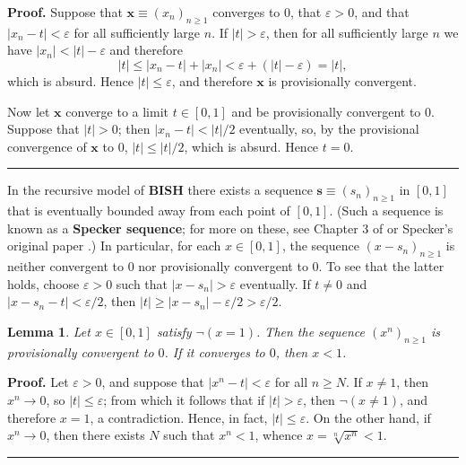 \documentclass[11pt]{article}%
\newtheorem{lemma}[theorem]{Lemma}
\newenvironment{proof}[1][Proof]{\noindent\textbf{#1.} }{\ \rule{0.5em}{0.5em}}
\begin{document}
\begin{proof}
Suppose that $\mathbf{x}\equiv\left(  x_{n}\right)  _{n\geqslant1}$ converges
to $0$, that $\varepsilon>0$, and that $\left\vert x_{n}-t\right\vert
<\varepsilon$ for all sufficiently large $n$. If $\left\vert t\right\vert
>\varepsilon$, then for all sufficiently large $n$ we have $\left\vert
x_{n}\right\vert <\left\vert t\right\vert -\varepsilon$ and therefore%
\[
\left\vert t\right\vert \leqslant\left\vert x_{n}-t\right\vert +\left\vert
x_{n}\right\vert <\varepsilon+\left(  \left\vert t\right\vert -\varepsilon
\right)  =\left\vert t\right\vert ,
\]
which is absurd. Hence $\left\vert t\right\vert \leqslant\varepsilon$, and
therefore $\mathbf{x}$ is provisionally convergent.

Now let $\mathbf{x}$ converge to a limit $t\in\left[  0,1\right]  $ and be
provisionally convergent to $0$. Suppose that $\left\vert t\right\vert >0$;
then $\left\vert x_{n}-t\right\vert <\left\vert t\right\vert /2$ eventually,
so, by the provisional convergence of $\mathbf{x}$ to $0$, $\left\vert
t\right\vert \leqslant\left\vert t\right\vert /2$, which is absurd. Hence
$t=0$.
\end{proof}%

\bigskip


In the recursive model of \textbf{BISH} there exists a sequence $\mathbf{s}%
\equiv\left(  s_{n}\right)  _{n\geqslant1}$ in $\left[  0,1\right]  $ that is
eventually bounded away from each point of $\left[  0,1\right]  $. (Such a
sequence is known as a \textbf{Specker sequence}; for more on these, see
Chapter 3 of \cite{BR} or Specker's original paper \cite{Specker}.) In
particular, for each $x\in\left[  0,1\right]  $, the sequence $\left(
x-s_{n}\right)  _{n\geqslant1}$ is neither convergent to $0$ nor provisionally
convergent to $0$. To see that the latter holds, choose $\varepsilon>0$ such
that $\left\vert x-s_{n}\right\vert >\varepsilon$ eventually. If $t\neq0$ and
$\left\vert x-s_{n}-t\right\vert <\varepsilon/2 $, then $\left\vert
t\right\vert \geq\left\vert x-s_{n}\right\vert -\varepsilon/2>\varepsilon/2$.

\begin{lemma}
\label{130511a3}Let $x\in\left[  0,1\right]  $ satisfy $\lnot\left(
x=1\right)  $. Then the sequence $\left(  x^{n}\right)  _{n\geqslant1}$ is
provisionally convergent to $0$. If it converges to $0$, then $x<1$.
\end{lemma}

\begin{proof}
Let $\varepsilon>0$, and suppose that $\left\vert x^{n}-t\right\vert
<\varepsilon$ for all $n\geqslant N$. If $x\neq1$, then $x^{n}\rightarrow0 $,
so $\left\vert t\right\vert \leqslant\varepsilon$; from which it follows that
if $\left\vert t\right\vert >\varepsilon$, then $\lnot\left(  x\neq1\right)
$, and therefore $x=1$, a contradiction. Hence, in fact, $\left\vert
t\right\vert \leqslant\varepsilon$. On the other hand, if $x^{n}\rightarrow0$,
then there exists $N$ such that $x^{n}<1$, whence $x=\sqrt[n]{x^{n}}<1$.
\end{proof}
\end{document}
